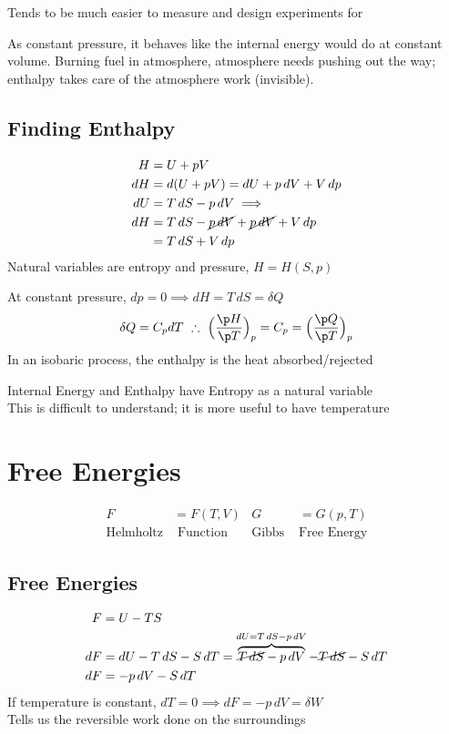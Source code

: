 \documentclass[a4paper, 11pt, normalem]{report}
\begin{document}
Tends to be much easier to measure and design experiments for

As constant pressure, it behaves like the internal energy would do at constant volume.
Burning fuel in atmosphere, atmosphere needs pushing out the way; enthalpy takes care of the atmosphere work (invisible).

\subsection{Finding Enthalpy}
\begin{align*}
    H &= U + pV \\
    dH &= d(U + pV) = dU + p\,dV + V\,dp \\
    dU &= T\,dS - p\,dV \implies \\
    dH &= T\,dS - \cancel{p\,dV} + \cancel{p\,dV} + V\,dp \\
       &= T\,dS + V\,dp
\end{align*}
Natural variables are entropy and pressure, $H = H(S,p)$

At constant pressure, $dp = 0 \implies dH = T\,dS = \delta Q$
\begin{equation*}
    \delta Q = C_p dT ~\therefore~ \Big(\frac{\p H}{\p T}\Big)_p = C_p = \Big(\frac{\p Q}{\p T}\Big)_p
\end{equation*}
In an isobaric process, the enthalpy is the heat absorbed/rejected

Internal Energy and Enthalpy have Entropy as a natural variable \\
This is difficult to understand; it is more useful to have temperature

\section{Free Energies}
\begin{align*}
    F &= F(T,V) & G &= G(p, T) \\
    \text{Helmholtz}& \text{ Function} & \text{Gibbs }&\text{Free Energy}
\end{align*}

\subsection{Free Energies}
\begin{align*}
    F &= U - TS \\
    dF &= dU - T\,dS - S\,dT = \overbrace{\cancel{T\,dS} - p\,dV}^{dU = T\,dS - p\,dV} - \cancel{T\,dS} - S\,dT \\
    dF &= -p\,dV - S\,dT
\end{align*}
If temperature is constant, $dT = 0 \implies dF = -p\,dV = \delta W$ \\
Tells us the reversible work done on the surroundings
\end{document}
